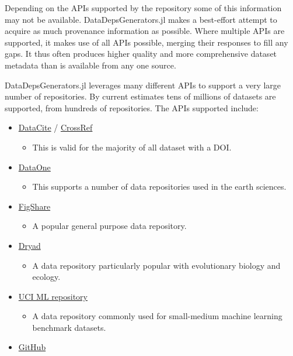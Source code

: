 \documentclass{book}
\begin{document}
Depending on the APIs supported by the repository some of this
information may not be available. DataDepsGenerators.jl makes a
best-effort attempt to acquire as much provenance information as
possible. Where multiple APIs are supported, it makes use of all APIs
possible, merging their responses to fill any gaps. It thus often
produces higher quality and more comprehensive dataset metadata than is
available from any one source.

DataDepsGenerators.jl leverages many different APIs to support a very
large number of repositories. By current estimates tens of millions of
datasets are supported, from hundreds of repositories. The APIs
supported include:

\begin{itemize}
	\item
	\href{https://datacite.org/}{DataCite} /
	\href{https://www.crossref.org/}{CrossRef}
	
	\begin{itemize}
		\item
		This is valid for the majority of all dataset with a DOI.
	\end{itemize}
	\item
	\href{https://www.dataone.org/}{DataOne}
	
	\begin{itemize}
		\item
		This supports a number of data repositories used in the earth
		sciences.
	\end{itemize}
	\item
	\href{http://figshare.com/}{FigShare}
	
	\begin{itemize}
		\item
		A popular general purpose data repository.
	\end{itemize}
	\item
	\href{http://datadryad.org/}{Dryad}
	
	\begin{itemize}
		\item
		A data repository particularly popular with evolutionary biology and
		ecology.
	\end{itemize}
	\item
	\href{https://archive.ics.uci.edu/ml/}{UCI ML repository}
	
	\begin{itemize}
		\item
		A data repository commonly used for small-medium machine learning
		benchmark datasets.
	\end{itemize}
	\item
	\href{https://github.com}{GitHub}
	

\end{itemize}
\end{document}

